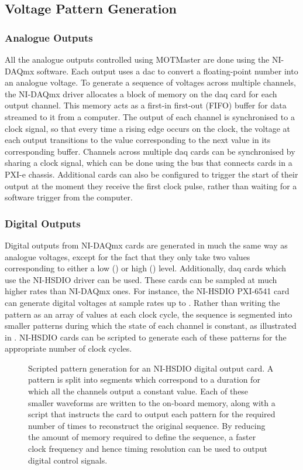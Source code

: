 \subsection{Voltage Pattern Generation}\label{subsec:compinterface_patterngen}
\subsubsection{Analogue Outputs}
All the analogue outputs controlled using MOTMaster are done using the
NI-DAQmx software. Each output uses a \ac{dac} to convert a floating-point
number into an analogue voltage. To generate a sequence of voltages across
multiple channels, the NI-DAQmx driver allocates a block of memory on the
\ac{daq} card for each output channel. This memory acts as a first-in
first-out (FIFO) buffer for data streamed to it from a computer. The output
of each channel is synchronised to a clock signal, so that every time a
rising edge occurs on the clock, the voltage at each output transitions to
the value corresponding to the next value in its corresponding buffer.
Channels across multiple \ac{daq} cards can be synchronised by sharing a
clock signal, which can be done using the bus that connects cards in a PXI-e
chassis. Additional cards can also be configured to trigger the start of
their output at the moment they receive the first clock pulse, rather than
waiting for a software trigger from the computer. \par\noindent
\subsubsection{Digital Outputs} 
Digital outputs from NI-DAQmx cards are generated in much the same way as
analogue voltages, except for the fact that they only take two values
corresponding to either a low () or high
() level. Additionally, \ac{daq} cards which use the
NI-HSDIO driver can be used. These cards can be sampled at much higher rates than NI-DAQmx ones. For instance, the NI-HSDIO PXI-6541 card can generate
digital voltages at sample rates up to . Rather than writing the pattern as an array of
values at each clock cycle, the sequence is segmented into smaller patterns
during which the state of each channel is constant, as illustrated in
. NI-HSDIO cards can be scripted to generate each
of these patterns for the appropriate number of clock cycles.
\begin{figure}
    \centering
    
    \caption[Scripted pattern generation for an NI-HSDIO card]{Scripted
    pattern generation for an NI-HSDIO digital output card. A pattern is
    split into segments which correspond to a duration for which all the
    channels output a constant value. Each of these smaller waveforms are
    written to the on-board memory, along with a script that instructs the
    card to output each pattern for the required number of times to
    reconstruct the original sequence. By reducing the amount of memory
    required to define the sequence, a faster clock frequency and hence
    timing resolution can be used to output digital control
    signals.}\label{fig:hsdio_timing}
\end{figure}
